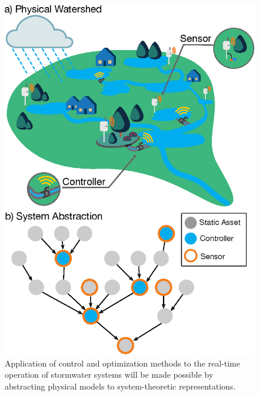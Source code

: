 \begin{figure}
\includegraphics{gfx/Chapter-1/k-drawing.eps} 
\caption{Application of control and optimization methods to the real-time operation of stormwater systems will be made possible by abstracting physical models to system-theoretic representations.}
\label{fgr:vision}
\end{figure}


